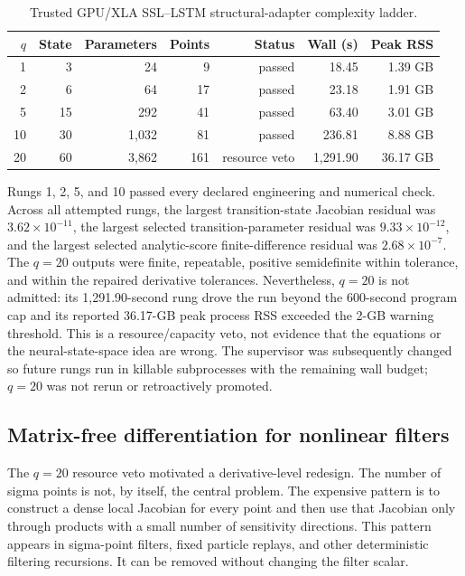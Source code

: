 \begin{table}[p]
  \centering
  \caption{Trusted GPU/XLA SSL--LSTM structural-adapter complexity ladder.}
  \label{tab:bf-ssl-lstm-complexity-ladder}
  \begin{tabular}{rrrrrrr}
    \toprule
    $q$ & State & Parameters & Points & Status & Wall (s) & Peak RSS \\
    \midrule
    1  & 3  & 24    & 9   & passed        & 18.45   & 1.39 GB \\
    2  & 6  & 64    & 17  & passed        & 23.18   & 1.91 GB \\
    5  & 15 & 292   & 41  & passed        & 63.40   & 3.01 GB \\
    10 & 30 & 1,032 & 81  & passed        & 236.81  & 8.88 GB \\
    20 & 60 & 3,862 & 161 & resource veto & 1,291.90 & 36.17 GB \\
    \bottomrule
  \end{tabular}
\end{table}

Rungs 1, 2, 5, and 10 passed every declared engineering and numerical check.
Across all attempted rungs, the largest transition-state Jacobian residual was
$3.62\times10^{-11}$, the largest selected transition-parameter residual was
$9.33\times10^{-12}$, and the largest selected analytic-score finite-difference
residual was $2.68\times10^{-7}$.  The $q=20$ outputs were finite, repeatable,
positive semidefinite within tolerance, and within the repaired derivative
tolerances.  Nevertheless, $q=20$ is not admitted: its 1,291.90-second rung
drove the run beyond the 600-second program cap and its reported 36.17-GB peak
process RSS exceeded the 2-GB warning threshold.  This is a resource/capacity
veto, not evidence that the equations or the neural-state-space idea are wrong.
The supervisor was subsequently changed so future rungs run in killable
subprocesses with the remaining wall budget; $q=20$ was not rerun or
retroactively promoted.

\subsection{Matrix-free differentiation for nonlinear filters}
\label{subsec:bf-ssl-lstm-matrix-free-filter-derivatives}

The $q=20$ resource veto motivated a derivative-level redesign.  The number
of sigma points is not, by itself, the central problem.  The expensive pattern
is to construct a dense local Jacobian for every point and then use that
Jacobian only through products with a small number of sensitivity directions.
This pattern appears in sigma-point filters, fixed particle replays, and other
deterministic filtering recursions.  It can be removed without changing the
filter scalar.

